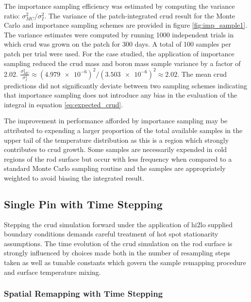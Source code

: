 The importance sampling efficiency was estimated by computing the variance ratio:  $\sigma^2_{MC}/\sigma^2_{I}$.  The variance of the patch-integrated crud result for the Monte Carlo and importance sampling schemes are provided in figure \ref{fig:imp_sample1}.  The variance estimates were computed by running 1000 independent trials in which crud was grown on the patch for 300 days.  A total of 100 samples per patch per trial were used.  For the case studied, the application of importance sampling reduced the crud mass and boron mass sample variance by a factor of 2.02. $\frac{\sigma^2_{MC}}{\sigma^2_{I}} \approx (\num{4.979e-6})^2 / (\num{3.503e-6})^2  \approx 2.02$.  The mean crud predictions did not significantly deviate between two sampling schemes indicating that importance sampling does not introduce any bias in the evaluation of the integral in equation \ref{eq:expected_crud}.

The improvement in performance afforded by importance sampling may be attributed to expending a larger proportion of the total available samples in the upper tail of the temperature distribution as this is a region which strongly contributes to crud growth.  Some samples are necessarily expended in cold regions of the rod surface but occur with less frequency when compared to a standard Monte Carlo sampling routine and the samples are appropriately weighted to avoid biasing the integrated result.


\subsection{Single Pin with Time Stepping}

Stepping the crud simulation forward under the application of hi2lo supplied boundary conditions demands careful treatment of hot spot stationarity assumptions.  The time evolution of the crud simulation on the rod surface is strongly influenced by choices made both in the number of resampling steps taken as well as tunable constants which govern the sample remapping procedure and surface temperature mixing.

\subsubsection{Spatial Remapping with Time Stepping}


